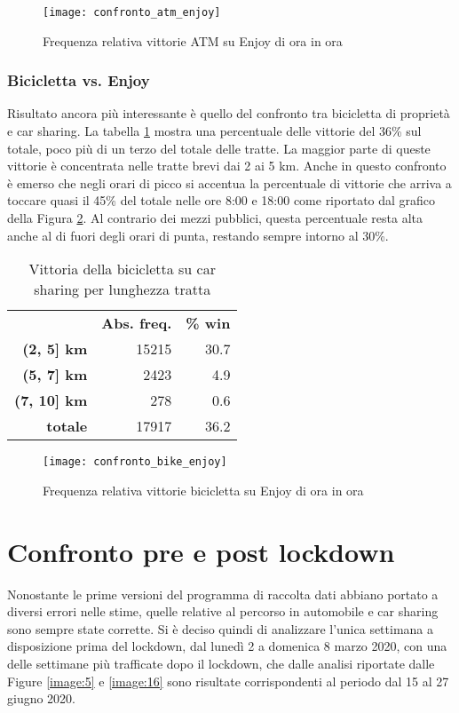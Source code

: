 \begin{figure}[H]
	\centering
	\texttt{[image: confronto\_atm\_enjoy]}
	\caption{Frequenza relativa vittorie ATM su Enjoy di ora in ora}
	\label{image:13}
\end{figure}

\subsubsection{Bicicletta vs. Enjoy}

Risultato ancora più interessante è quello del confronto tra bicicletta di proprietà e car sharing. La tabella \ref{table:6} mostra una percentuale delle vittorie del 36\% sul totale, poco più di un terzo del totale delle tratte. La maggior parte di queste vittorie è concentrata nelle tratte brevi dai 2 ai 5 km. Anche in questo confronto è emerso che negli orari di picco si accentua la percentuale di vittorie che arriva a toccare quasi il 45\% del totale nelle ore 8:00 e 18:00 come riportato dal grafico della Figura \ref{image:14}. Al contrario dei mezzi pubblici, questa percentuale resta alta anche al di fuori degli orari di punta, restando sempre intorno al 30\%.

\begin{table}[H]
	\centering
	\begin{tabular}{ | r r r | }
		\hline
		& \textbf{Abs. freq.} & \textbf{\% win} \\
		\textbf{(2, 5] km} & 15215 & 30.7 \\
		\textbf{(5, 7] km} & 2423 & 4.9 \\
		\textbf{(7, 10] km} & 278 & 0.6 \\
		\hline
		\textbf{totale} & 17917 & 36.2 \\
		\hline
	\end{tabular}
	\caption{Vittoria della bicicletta su car sharing per lunghezza tratta}
	\label{table:6}
\end{table}

\begin{figure}[H]
	\centering
	\texttt{[image: confronto\_bike\_enjoy]}
	\caption{Frequenza relativa vittorie bicicletta su Enjoy di ora in ora}
	\label{image:14}
\end{figure}

\section{Confronto pre e post lockdown}

Nonostante le prime versioni del programma di raccolta dati abbiano portato a diversi errori nelle stime, quelle relative al percorso in automobile e car sharing sono sempre state corrette. Si è deciso quindi di analizzare l'unica settimana a disposizione prima del lockdown, dal lunedì 2 a domenica 8 marzo 2020, con una delle settimane più trafficate dopo il lockdown, che dalle analisi riportate dalle Figure \ref{image:5} e \ref{image:16} sono risultate corrispondenti al periodo dal 15 al 27 giugno 2020.


